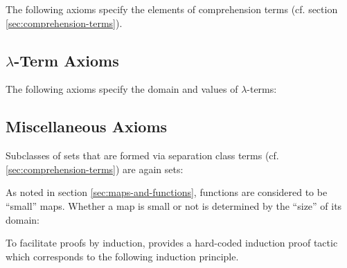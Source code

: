 \documentclass{stex}
\begin{document}
The following axioms specify the elements of comprehension terms (cf. section
\ref{sec:comprehension-terms}).



\subsection{$\lambda$-Term Axioms}\label{sec:lambda-term-axioms}

The following axioms specify the domain and values of $\lambda$-terms:



\subsection{Miscellaneous Axioms}\label{sec:misc-axioms}

Subclasses of sets that are formed via separation class terms (cf.
\ref{sec:comprehension-terms}) are again sets:


As noted in section \ref{sec:maps-and-functions}, functions are considered to be
``small'' maps. Whether a map is small or not is determined by the ``size'' of
its domain:


To facilitate proofs by induction, \Naproche provides a hard-coded induction
proof tactic which corresponds to the following induction principle.



\end{document}
